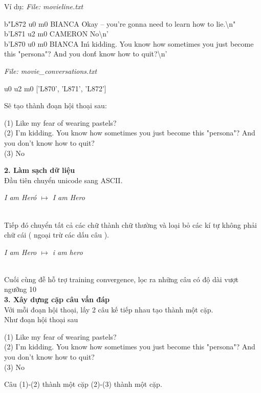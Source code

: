 Ví dụ:
\textit{File: movie\detokenize{_}line.txt}
\begin{displayquote}
b"L872 \detokenize{+++\$+++}  u0 \detokenize{+++\$+++}  m0 \detokenize{+++\$+++}  BIANCA \detokenize{+++\$+++}  Okay -- you're gonna need to learn how to lie.\textbackslash{}n" \\
b'L871 \detokenize{+++\$+++}  u2 \detokenize{+++\$+++}  m0 \detokenize{+++\$+++}  CAMERON \detokenize{+++\$+++}  No\textbackslash{}n' \\
b'L870 \detokenize{+++\$+++}  u0 \detokenize{+++\$+++}  m0 \detokenize{+++\$+++}  BIANCA \detokenize{+++\$+++}  I\'m kidding.  You know how sometimes you just become this
"persona"?  And you don\'t know how to quit?\textbackslash{}n' \\
\end{displayquote}
\textit{File: movie\_conversations.txt}
\begin{displayquote}
    u0 \detokenize{+++\$+++} u2 \detokenize{+++\$+++} m0 \detokenize{+++\$+++} ['L870', 'L871', 'L872']
\end{displayquote}

Sẽ tạo thành đoạn hội thoại sau:
\begin{displayquote}
    (1) Like my fear of wearing pastels? \\
    (2) I'm kidding.  You know how sometimes you just become this "persona"?  And you don't know how to quit? \\
    (3) No \\
\end{displayquote}

\textbf{2. Làm sạch dữ liệu} \\
Đầu tiên chuyển unicode sang ASCII.\\
    \centerline{\textit{I am Heró \(\mapsto\) I am Hero}} \\
Tiếp đó chuyển tất cả các chữ thành chữ thường và loại bỏ các kí tự không phải chữ cái ( ngoại trừ các dấu câu ). \\
    \centerline{\textit{I am Hero  \(\mapsto\) i am hero}} \\
Cuối cùng đễ hỗ trợ training convergence, lọc ra những câu có độ dài vượt ngưỡng 10 \\

\textbf{3. Xây dựng cặp câu vấn đáp} \\
Với mỗi đoạn hội thoại, lấy 2 câu kế tiếp nhau tạo thành một cặp.\\
Như đoạn hội thoại sau
\begin{displayquote}
    (1) Like my fear of wearing pastels? \\
    (2) I'm kidding.  You know how sometimes you just become this "persona"?  And you don't know how to quit? \\
    (3) No \\
\end{displayquote}
Câu (1)-(2) thành một cặp (2)-(3) thành một cặp.

